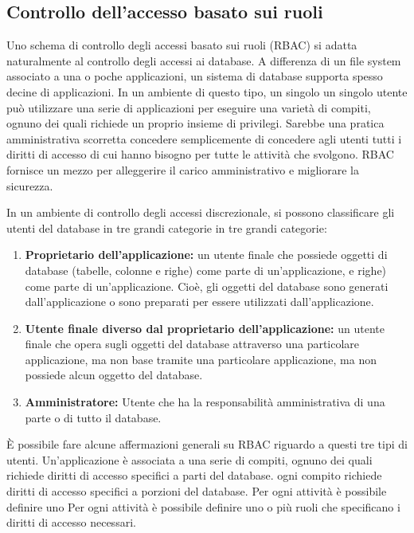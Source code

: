 \subsection{Controllo dell'accesso basato sui ruoli}
Uno schema di controllo degli accessi basato sui ruoli (RBAC) si adatta naturalmente al controllo degli accessi ai database. A differenza di un file system associato a una o poche applicazioni, un sistema di database supporta spesso decine di applicazioni. In un ambiente di questo tipo, un singolo un singolo utente può utilizzare una serie di applicazioni per eseguire una varietà di compiti, ognuno dei quali richiede un proprio insieme di privilegi. Sarebbe una pratica amministrativa scorretta concedere semplicemente di concedere agli utenti tutti i diritti di accesso di cui hanno bisogno per tutte le attività che svolgono. RBAC fornisce un mezzo per alleggerire il carico amministrativo e migliorare la sicurezza.

\singlespacing

In un ambiente di controllo degli accessi discrezionale, si possono classificare gli utenti del database in tre grandi categorie in tre grandi categorie:

\begin{enumerate}
    \item \textbf{Proprietario dell'applicazione:} un utente finale che possiede oggetti di database (tabelle, colonne e righe) come parte di un'applicazione, e righe) come parte di un'applicazione. Cioè, gli oggetti del database sono generati dall'applicazione o sono preparati per essere utilizzati dall'applicazione.
    
    \item \textbf{Utente finale diverso dal proprietario dell'applicazione:} un utente finale che opera sugli oggetti del database attraverso una particolare applicazione, ma non base tramite una particolare applicazione, ma non possiede alcun oggetto del database.
    
    \item \textbf{Amministratore:} Utente che ha la responsabilità amministrativa di una parte o di tutto il database.
\end{enumerate}
È possibile fare alcune affermazioni generali su RBAC riguardo a questi tre tipi di utenti. Un'applicazione è associata a una serie di compiti, ognuno dei quali richiede diritti di accesso specifici a parti del database. ogni compito richiede diritti di accesso specifici a porzioni del database. Per ogni attività è possibile definire uno Per ogni attività è possibile definire uno o più ruoli che specificano i diritti di accesso necessari. 


